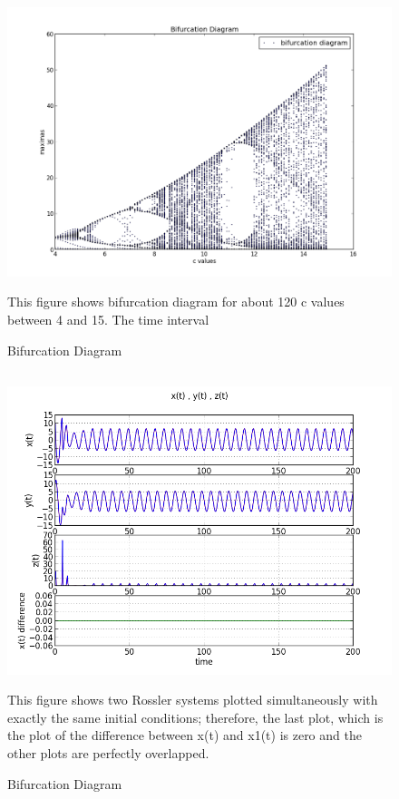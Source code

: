 \documentclass[letterpaper,12pt]{article}
\begin{document}
\FloatBarrier
\begin{figure}[h!]
\centering
\includegraphics[scale=0.6]{1_d.png}
\caption{Bifurcation Diagram}
This figure shows bifurcation diagram for about 120 c values between 4 and 15. The time interval
\end{figure}
\FloatBarrier

\subsection{}

\FloatBarrier
\begin{figure}[h!]
\centering
\includegraphics[scale=0.7]{1_e_zero.png}
\caption{Bifurcation Diagram}
This figure shows two Rossler systems plotted simultaneously with exactly the same initial conditions; therefore, the last plot, which is the plot of the difference between x(t) and x1(t) is zero and the other plots are perfectly overlapped.
\end{figure}
\FloatBarrier
\end{document}
